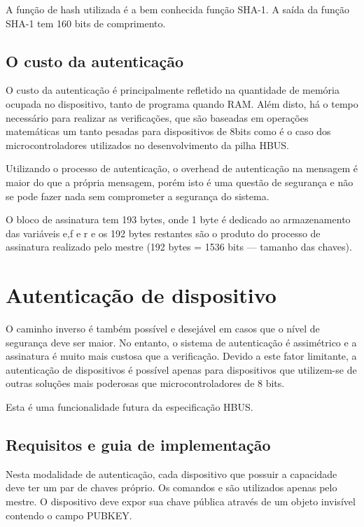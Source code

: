 \documentclass[11pt]{report}
\begin{document}
A função de hash utilizada é a bem conhecida função SHA-1. A saída da função SHA-1 tem 160 bits de comprimento.

\subsection{O custo da autenticação}

O custo da autenticação é principalmente refletido na quantidade de memória ocupada no dispositivo, tanto de programa quando RAM. Além disto, há o tempo necessário para realizar as verificações, que são baseadas em operações matemáticas um tanto pesadas para dispositivos de 8bits como é o caso dos microcontroladores utilizados no desenvolvimento da pilha HBUS.

Utilizando o processo de autenticação, o overhead de autenticação na mensagem é maior do que a própria mensagem, porém isto é uma questão de segurança e não se pode fazer nada sem comprometer a segurança do sistema.

O bloco de assinatura tem 193 bytes, onde 1 byte é dedicado ao armazenamento das variáveis e,f e r e os 192 bytes restantes são o produto do processo de assinatura realizado pelo mestre (192 bytes = 1536 bits --- tamanho das chaves). 

\section{Autenticação de dispositivo}

O caminho inverso é também possível e desejável em casos que o nível de segurança deve ser maior. No entanto, o sistema de autenticação é assimétrico e a assinatura é muito mais custosa que a verificação. Devido a este fator limitante, a autenticação de dispositivos é possível apenas para dispositivos que utilizem-se de outras soluções mais poderosas que microcontroladores de 8 bits.

Esta é uma funcionalidade futura da especificação HBUS.

\subsection{Requisitos e guia de implementação}

Nesta modalidade de autenticação, cada dispositivo que possuir a capacidade deve ter um par de chaves próprio. Os comandos  e  são utilizados apenas pelo mestre. O dispositivo deve expor sua chave pública através de um objeto invisível contendo o campo PUBKEY.
\end{document}
